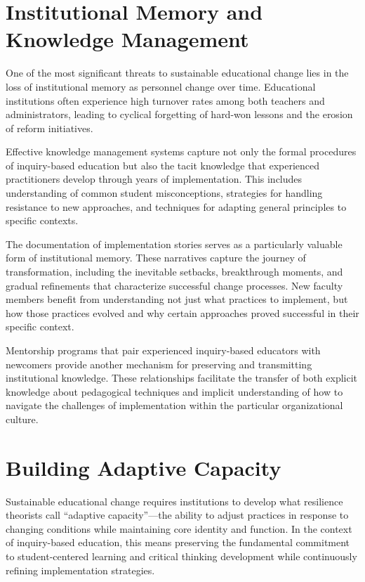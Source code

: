 \documentclass[
  Letterpaper,
]{scrbook}
\begin{document}
\section{Institutional Memory and Knowledge
Management}\label{institutional-memory-and-knowledge-management}

One of the most significant threats to sustainable educational change
lies in the loss of institutional memory as personnel change over time.
Educational institutions often experience high turnover rates among both
teachers and administrators, leading to cyclical forgetting of hard-won
lessons and the erosion of reform initiatives.

Effective knowledge management systems capture not only the formal
procedures of inquiry-based education but also the tacit knowledge that
experienced practitioners develop through years of implementation. This
includes understanding of common student misconceptions, strategies for
handling resistance to new approaches, and techniques for adapting
general principles to specific contexts.

The documentation of implementation stories serves as a particularly
valuable form of institutional memory. These narratives capture the
journey of transformation, including the inevitable setbacks,
breakthrough moments, and gradual refinements that characterize
successful change processes. New faculty members benefit from
understanding not just what practices to implement, but how those
practices evolved and why certain approaches proved successful in their
specific context.

Mentorship programs that pair experienced inquiry-based educators with
newcomers provide another mechanism for preserving and transmitting
institutional knowledge. These relationships facilitate the transfer of
both explicit knowledge about pedagogical techniques and implicit
understanding of how to navigate the challenges of implementation within
the particular organizational culture.

\section{Building Adaptive Capacity}\label{building-adaptive-capacity}

Sustainable educational change requires institutions to develop what
resilience theorists call ``adaptive capacity''---the ability to adjust
practices in response to changing conditions while maintaining core
identity and function. In the context of inquiry-based education, this
means preserving the fundamental commitment to student-centered learning
and critical thinking development while continuously refining
implementation strategies.
\end{document}
